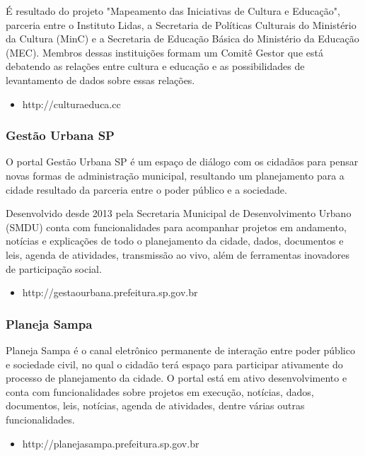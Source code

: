 \documentclass[12pt]{article}
\begin{document}
É resultado do projeto "Mapeamento das Iniciativas de Cultura e
Educação", parceria entre o Instituto Lidas, a Secretaria de Políticas
Culturais do Ministério da Cultura (MinC) e a Secretaria de Educação Básica do
Ministério da Educação (MEC). Membros dessas instituições formam um Comitê
Gestor que está debatendo as relações entre cultura e educação e as
possibilidades de levantamento de dados sobre essas relações. 

\begin{itemize}
  \item http://culturaeduca.cc
\end{itemize}

\subsubsection{Gestão Urbana SP}

O portal Gestão Urbana SP é um espaço de diálogo com os cidadãos para pensar
novas formas de administração municipal, resultando um planejamento para a
cidade resultado da parceria entre o poder público e a sociedade.

Desenvolvido desde 2013 pela Secretaria Municipal de Desenvolvimento Urbano
(SMDU) conta com funcionalidades para acompanhar projetos em andamento,
notícias e explicações de todo o planejamento da cidade, dados, documentos e
leis, agenda de atividades, transmissão ao vivo, além de ferramentas
inovadores de participação social.

\begin{itemize}
  \item http://gestaourbana.prefeitura.sp.gov.br
\end{itemize}

\subsubsection{Planeja Sampa}

Planeja Sampa é o canal eletrônico permanente de interação entre poder público
e sociedade civil, no qual o cidadão terá espaço para participar ativamente do
processo de planejamento da cidade. O portal está em ativo desenvolvimento e
conta com funcionalidades sobre projetos em execução, notícias, dados,
documentos, leis, notícias, agenda de atividades, dentre várias outras
funcionalidades.

\begin{itemize}
  \item http://planejasampa.prefeitura.sp.gov.br
\end{itemize}
\end{document}
